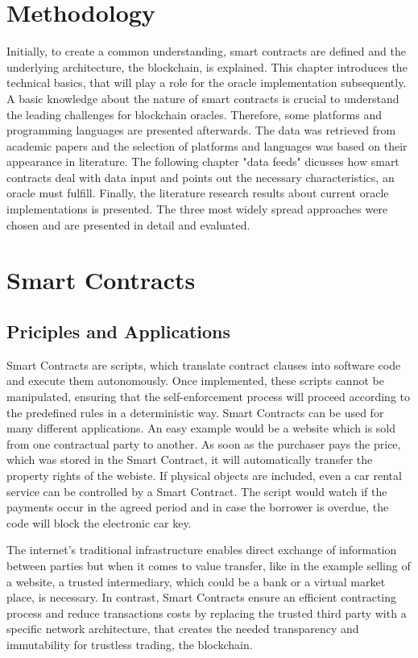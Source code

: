 \documentclass[conference]{IEEEtran}
\begin{document}
\section{Methodology}
Initially, to create a common understanding, smart contracts are defined and the underlying architecture, the blockchain, is explained. This chapter introduces the technical basics, that will play a role for the oracle implementation subsequently. A basic knowledge about the nature of smart contracts is crucial to understand the leading challenges for blockchain oracles. Therefore, some platforms and programming languages are presented afterwards. The data was retrieved from academic papers and the selection of platforms and languages was based on their appearance in literature. The following chapter "data feeds" dicusses how smart contracts deal with data input and points out the necessary characteristics, an oracle must fulfill. Finally, the literature research results about current oracle implementations is presented. The three most widely spread approaches were chosen and are presented in detail and evaluated.
\section{Smart Contracts}
\subsection{Priciples and Applications}

Smart Contracts are scripts, which translate contract clauses into software code and execute them autonomously. Once implemented, these scripts cannot be manipulated, ensuring that the self-enforcement process will proceed according to the predefined rules in a deterministic way.   
Smart Contracts can be used for many different applications. An easy example would be a website which is sold from one contractual party to another. As soon as the purchaser pays the price, which was stored in the Smart Contract, it will automatically transfer the property rights of the webiste. If physical objects are included, even a car rental service can be controlled by a Smart Contract. The script would watch if the payments occur in the agreed period and in case the borrower is overdue, the code will block the electronic car key. \cite{Meitinger2017} \cite{Spancken2016} \cite{Jung2017} \cite{Lee2016}\par 
The internet's traditional infrastructure enables direct exchange of information between parties but when it comes to value transfer, like in the example selling of a website, a trusted intermediary, which could be a bank or a virtual market place, is necessary. In contrast, Smart Contracts ensure an efficient contracting process and reduce transactions costs by replacing the trusted third party with a specific network architecture, that creates the needed transparency and immutability for trustless trading, the blockchain. \cite{Meitinger2017}
\end{document}
